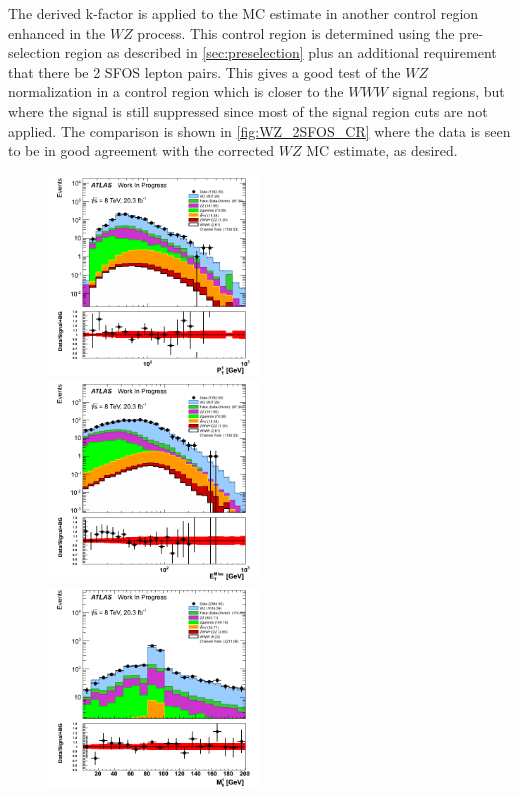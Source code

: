 The derived k-factor is applied to the MC estimate in another control
region enhanced in the $WZ$ process. This control region is determined
using the pre-selection region as described in \sec\ref{sec:preselection}
plus an additional requirement that there be 2 SFOS lepton pairs.
This gives a good test of the $WZ$ normalization in a control region
which is closer to the $WWW$ signal regions, but where the signal is still
suppressed since most of the signal region cuts are not applied.
The comparison is shown in \fig\ref{fig:WZ_2SFOS_CR} where
the data is seen to be in good agreement with the corrected $WZ$ MC
estimate, as desired.

\begin{figure}[htp]
\centering
\includegraphics[width=0.495\textwidth]{figures/WZ_CR/LeadingLeptonPt_histratio.png}
\includegraphics[width=0.495\textwidth]{figures/WZ_CR/MET_Et_histratio.png}
\includegraphics[width=0.495\textwidth]{figures/WZ_CR/InvariantMassSFOS_histratio.png}

\end{figure}
